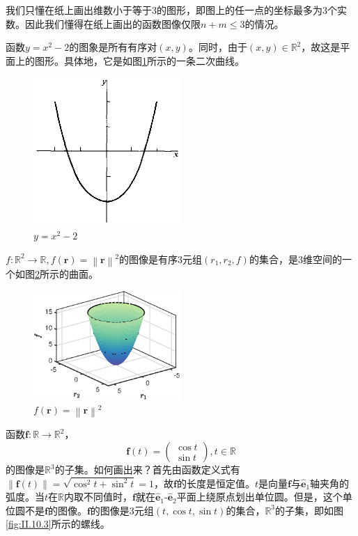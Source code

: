 \documentclass[main.tex]{subfiles}
\begin{document}
我们只懂在纸上画出维数小于等于3的图形，即图上的任一点的坐标最多为3个实数。因此我们懂得在纸上画出的函数图像仅限$n+m\leq3$的情况。
\begin{example}
函数$y=x^2-2$的图象是所有有序对$\left(x,y\right)$。同时，由于$\left(x,y\right)\in\mathbb{R}^2$，故这是平面上的图形。具体地，它是如图\ref{fig:II.10.1}所示的一条二次曲线。
\end{example}
\begin{figure}[h]
    \centering
    \includegraphics[width=0.5\textwidth]{images/II.10.1.eps}
    \caption{$y=x^2-2$}
    \label{fig:II.10.1}
\end{figure}
\begin{example}\label{exp:II.12.5}
$f:\mathbb{R}^2\rightarrow\mathbb{R},f\left(\mathbf{r}\right)=\left\|\mathbf{r}\right\|^2$的图像是有序3元组$\left(r_1,r_2,f\right)$的集合，是3维空间的一个如图\ref{fig:II.10.2}所示的曲面。
\end{example}
\begin{figure}[h]
    \centering
    \includegraphics[width=0.5\textwidth]{images/II.10.2.eps}
    \caption{$f\left(\mathbf{r}\right)=\left\|\mathbf{r}\right\|^2$}
    \label{fig:II.10.2}
\end{figure}
\begin{example}\label{exp:II.12.6}
    函数$\mathbf{f}:\mathbb{R}\rightarrow\mathbb{R}^2$，
\[
\mathbf{f}\left(t\right)=\left(\begin{array}{c}\cos t\\\sin t\end{array}\right),t\in\mathbb{R}
\]
的图像是$\mathbb{R}^3$的子集。如何画出来？首先由函数定义式有$\left\|\mathbf{f}\left(t\right)\right\|=\sqrt{\cos^2t+\sin^2t}=1$，故$\mathbf{f}$的长度是恒定值。$t$是向量$\mathbf{f}$与$\mathbf{\hat{e}}_1$轴夹角的弧度。当$t$在$\mathbb{R}$内取不同值时，$\mathbf{f}$就在$\mathbf{\hat{e}}_1$-$\mathbf{\hat{e}}_2$平面上绕原点划出单位圆。但是，这个单位圆不是$\mathbf{f}$的图像。$\mathbf{f}$的图像是3元组$\left(t,\cos t,\sin t\right)$的集合，$\mathbb{R}^3$的子集，即如图\ref{fig:II.10.3}所示的螺线。
\end{example}
\end{document}
